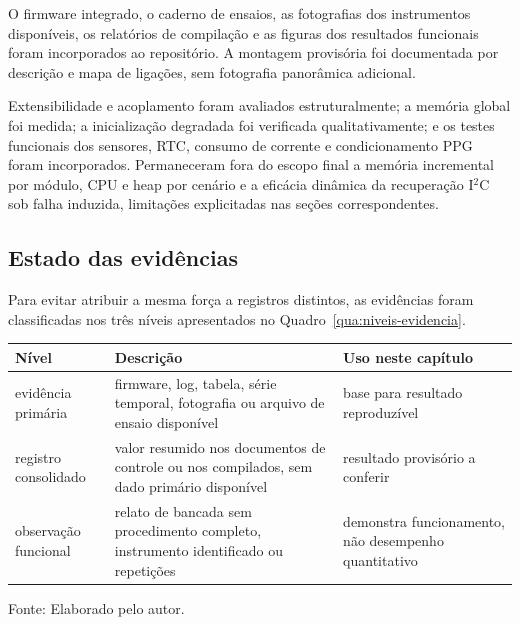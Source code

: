 \documentclass[a4paper,12pt]{article}
\newcommand{\fonteelemento}[1]{%
  \par\smallskip
  {\fontsize{10}{12}\selectfont\raggedright Fonte: #1.\par}%
}
\begin{document}
O firmware integrado, o caderno de ensaios, as fotografias dos instrumentos dispon\'iveis, os relat\'orios de compila\c{c}\~ao e as figuras dos resultados funcionais foram incorporados ao reposit\'orio. A montagem provis\'oria foi documentada por descri\c{c}\~ao e mapa de liga\c{c}\~oes, sem fotografia panor\^amica adicional.

Extensibilidade e acoplamento foram avaliados estruturalmente; a mem\'oria global foi medida; a inicializa\c{c}\~ao degradada foi verificada qualitativamente; e os testes funcionais dos sensores, RTC, consumo de corrente e condicionamento PPG foram incorporados. Permaneceram fora do escopo final a mem\'oria incremental por m\'odulo, CPU e heap por cen\'ario e a efic\'acia din\^amica da recupera\c{c}\~ao I$^2$C sob falha induzida, limita\c{c}\~oes explicitadas nas se\c{c}\~oes correspondentes.


\subsection{Estado das evid\^encias}


Para evitar atribuir a mesma for\c{c}a a registros distintos, as evid\^encias foram classificadas nos tr\^es n\'iveis apresentados no Quadro~\ref{qua:niveis-evidencia}.


\begin{quadro}[H]
\centering
\caption{Classifica\c{c}\~ao das evid\^encias empregadas}
\label{qua:niveis-evidencia}
\small
\begin{tabularx}{\textwidth}{|>{\raggedright\arraybackslash}p{}|>{\raggedright\arraybackslash}p{}|>{\raggedright\arraybackslash}X|}
\hline
\textbf{N\'ivel} & \textbf{Descri\c{c}\~ao} & \textbf{Uso neste cap\'itulo} \\
\hline
evid\^encia prim\'aria & firmware, log, tabela, s\'erie temporal, fotografia ou arquivo de ensaio dispon\'ivel & base para resultado reproduz\'ivel \\
\hline
registro consolidado & valor resumido nos documentos de controle ou nos compilados, sem dado prim\'ario dispon\'ivel & resultado provis\'orio a conferir \\
\hline
observa\c{c}\~ao funcional & relato de bancada sem procedimento completo, instrumento identificado ou repeti\c{c}\~oes & demonstra funcionamento, n\~ao desempenho quantitativo \\
\hline
\end{tabularx}
\fonteelemento{Elaborado pelo autor}
\end{quadro}
\end{document}
